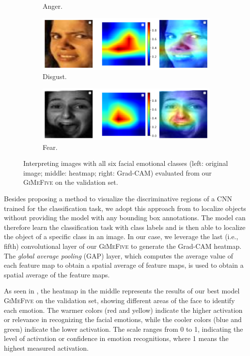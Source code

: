 \begin{figure}[ht]
\begin{subfigure}{0.47\linewidth}
    \caption{Anger.}
    \label{fig:xai4}
  \end{subfigure}
  \hfill
  \begin{subfigure}{0.47\linewidth}
    \includegraphics[width=\linewidth]{xai_disgust.png}
    \caption{Disgust.}
    \label{fig:xai5}
  \end{subfigure}
  \hfill
  \begin{subfigure}{0.47\linewidth}
    \includegraphics[width=\linewidth]{xai_fear.png}
    \caption{Fear.}
    \label{fig:xai6}
  \end{subfigure}
  \caption{Interpreting images with all six facial emotional classes (left: original image; middle: heatmap; right: Grad-CAM) evaluated from our \textsc{GiMeFive} on the validation set.}
  \label{fig:xai}
\end{figure}

Besides proposing a method to visualize the discriminative regions of a CNN trained for the classification task, 
we adopt this approach from \citet{ZhouKLOT16} to localize objects without providing the model with any bounding box annotations. 
The model can therefore learn the classification task with class labels and is then able to localize the object of a specific class in an image. 
In our case, we leverage the last (i.e., fifth) convolutional layer of our \textsc{GiMeFive} to generate the Grad-CAM heatmap. 
The \textit{global average pooling} (GAP) layer, 
which computes the average value of each feature map to obtain a spatial average of feature maps, 
is used to obtain a spatial average of the feature maps. 

As seen in , 
the heatmap in the middle represents the results of our best model \textsc{GiMeFive} on the validation set, 
showing different areas of the face to identify each emotion. 
The warmer colors (red and yellow) indicate the higher activation or relevance in recognizing the facial emotions, 
while the cooler colors (blue and green) indicate the lower activation. 
The scale ranges from 0 to 1, 
indicating the level of activation or confidence in emotion recognitions,
where 1 means the highest measured activation. 

